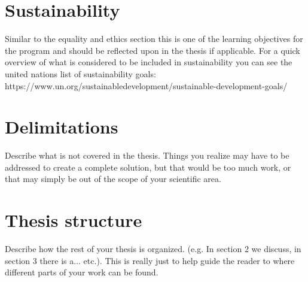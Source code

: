 \section{Sustainability}
Similar to the equality and ethics section this is one of the learning objectives for the program and should be reflected upon in the thesis if applicable. For a quick overview of what is considered to be included in sustainability you can see the united nations list of sustainability goals: https://www.un.org/sustainabledevelopment/sustainable-development-goals/
\section{Delimitations}
Describe what is not covered in the thesis. Things you realize may have to be addressed to create a complete solution, but that would be too much work, or that may simply be out of the scope of your scientific area.
\section{Thesis structure}
Describe how the rest of your thesis is organized. (e.g. In section 2 we discuss, in section 3 there is a... etc.). This is really just to help guide the reader to where different parts of your work can be found.
